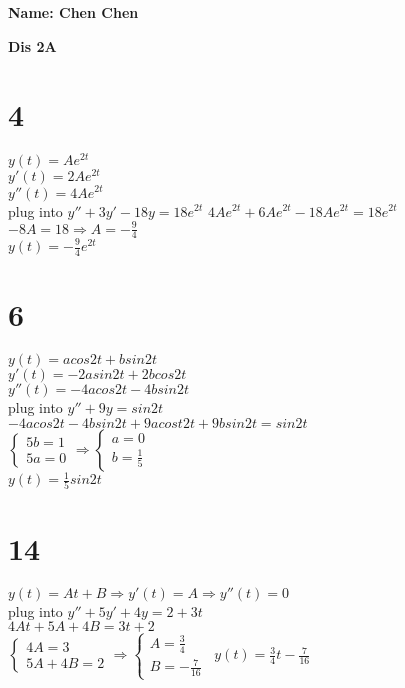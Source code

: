 \documentclass[12pt, a4paper]{IEEEtran}
\begin{document}
    \centerline{\textbf{Name: Chen Chen}}
    
    \centerline{\textbf{Dis 2A}}
    \begin{flushleft}
    \section*{4}
        $y(t)=Ae^{2t}$\\
        $y'(t)=2Ae^{2t}$\\
        $y''(t)=4Ae^{2t}$\\
        plug into $y''+3y'-18y=18e^{2t}$
        $4Ae^{2t}+6Ae^{2t}-18Ae^{2t}=18e^{2t}$\\
        $-8A=18\Rightarrow A=-\frac{9}{4}$\\
        $y(t)=-\frac{9}{4}e^{2t}$


    \section*{6}
    $y(t)=acos2t+bsin2t$\\
    $y'(t)=-2asin2t+2bcos2t$\\
    $y''(t)=-4acos2t-4bsin2t$\\
    plug into $y''+9y=sin2t$\\
    $-4acos2t-4bsin2t+9acost2t+9bsin2t=sin2t$\\
    \vspace{1ex}
    $\begin{cases}
    5b=1\\
    5a=0
    \end{cases}
    \Rightarrow
    \begin{cases}
        a=0\\
        b=\frac{1}{5}
    \end{cases}$\\
    $y(t)=\frac{1}{5}sin2t$


    \section*{14}
    $y(t)=At+B \Rightarrow y'(t)=A \Rightarrow y''(t)=0$\\
    plug into $y''+5y'+4y=2+3t$\\
    $4At+5A+4B=3t+2$\\
    \vspace{1ex}
    $\begin{cases}
        4A=3\\
        5A+4B=2
    \end{cases}
    \Rightarrow
    \begin{cases}
        A=\frac{3}{4}\\
        B=-\frac{7}{16}
    \end{cases}$\
    $y(t)=\frac{3}{4}t-\frac{7}{16}$


\end{flushleft}
\end{document}
